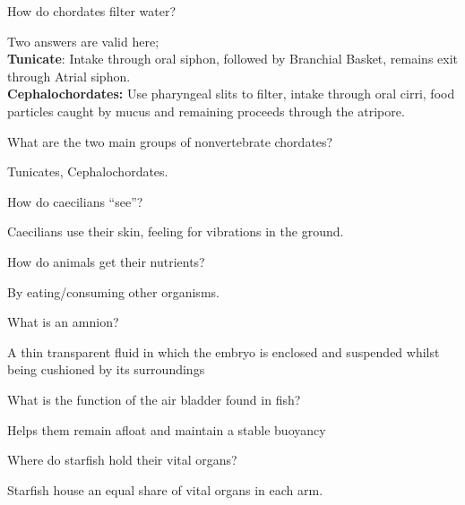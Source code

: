 \documentclass[12pt]{article} %
\begin{document}
  \begin{qstn}
    How do chordates filter water?
  \end{qstn}
  \begin{soln}
    Two answers are valid here;\\
    \textbf{Tunicate}: Intake through oral siphon, followed by Branchial Basket, remains exit through Atrial siphon.\\
    \textbf{Cephalochordates:} Use pharyngeal slits to filter, intake through oral cirri, food particles caught by mucus and remaining proceeds through the atripore.
  \end{soln}

  \begin{qstn}
    What are the two main groups of nonvertebrate chordates?
  \end{qstn}
  \begin{soln}
    Tunicates, Cephalochordates.
  \end{soln}

  \begin{qstn}
    How do caecilians ``see''?
  \end{qstn}
  \begin{soln}
    Caecilians use their skin, feeling for vibrations in the ground.
  \end{soln}

  \begin{qstn}
    How do animals get their nutrients?
  \end{qstn}
  \begin{soln}
    By eating/consuming other organisms.
  \end{soln}

  \begin{qstn}
    What is an amnion?
  \end{qstn}
  \begin{soln}
    A thin transparent fluid in which the embryo is enclosed and suspended whilst being cushioned by its
      surroundings
  \end{soln}

  \begin{qstn}
    What is the function of the air bladder found in fish?
  \end{qstn}
  \begin{soln}
    Helps them remain afloat and maintain a stable buoyancy
  \end{soln}

  \begin{qstn}
    Where do starfish hold their vital organs?
  \end{qstn}
  \begin{soln}
    Starfish house an equal share of vital organs in each arm.
  \end{soln}
\end{document}
